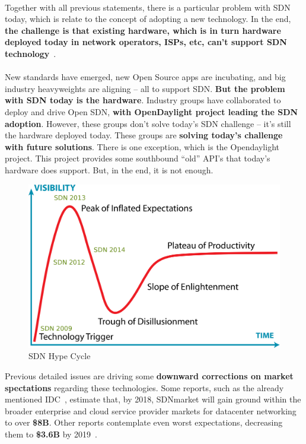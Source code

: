 \documentclass[a4paper, 12pt]{book}
\begin{document}
\\
Together with all previous statements, there is a particular problem with SDN today, which is relate to the concept of adopting a new technology. In the end, \textbf{the challenge is that existing hardware, which is in turn hardware deployed today in network operators, ISPs, etc, can’t support SDN technology}~\cite{TagArchivesSDN}.\\
\\
New standards have emerged, new Open Source apps are incubating, and big industry heavyweights are aligning – all to support SDN. \textbf{But the problem with SDN today is the hardware}. Industry groups have collaborated to deploy and drive Open SDN, \textbf{with OpenDaylight project leading the SDN adoption}. However, these groups don’t solve today’s SDN challenge – it’s still the hardware deployed today. These groups are \textbf{solving today’s challenge with future solutions}. There is one exception, which is the Opendaylight project. This project provides some southbound “old” API’s that today’s hardware does support. But, in the end, it is not enough.
\begin{center}
 \begin{figure}[H]
 \begin{center}
   \includegraphics[width=15cm]{img/hype-cycle-03.png}
   \caption{SDN Hype Cycle}
   \label{fig:sdn_hype_cyle}
 \end{center}
 \end{figure}
\end{center}
Previous detailed issues are driving some \textbf{downward corrections on market spectations} regarding these technologies. Some reports, such as the already mentioned IDC~\cite{SDNMarket20142018IDC}, estimate that, by 2018, SDNmarket will gain ground within the broader enterprise and cloud service provider markets for datacenter networking to over \textbf{\$8B}. Other reports contemplate even worst expectations, decreasing them to \textbf{\$3.6B} by 2019~\cite{SDNMarket20142018PRNewsWire}.
\end{document}
